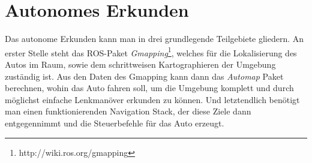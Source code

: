 \section{Autonomes Erkunden}
\label{sec:mapping}
Das autonome Erkunden kann man in drei grundlegende Teilgebiete gliedern. An erster Stelle steht das ROS-Paket \textit{Gmapping}\footnote{http://wiki.ros.org/gmapping}, welches für die Lokalisierung des Autos im Raum, sowie dem schrittweisen Kartographieren der Umgebung zuständig ist. Aus den Daten des Gmapping kann dann das \textit{Automap} Paket berechnen, wohin das Auto fahren soll, um die Umgebung komplett und durch möglichst einfache Lenkmanöver erkunden zu können. Und letztendlich benötigt man einen funktionierenden Navigation Stack, der diese Ziele dann entgegennimmt und die Steuerbefehle für das Auto erzeugt. 

